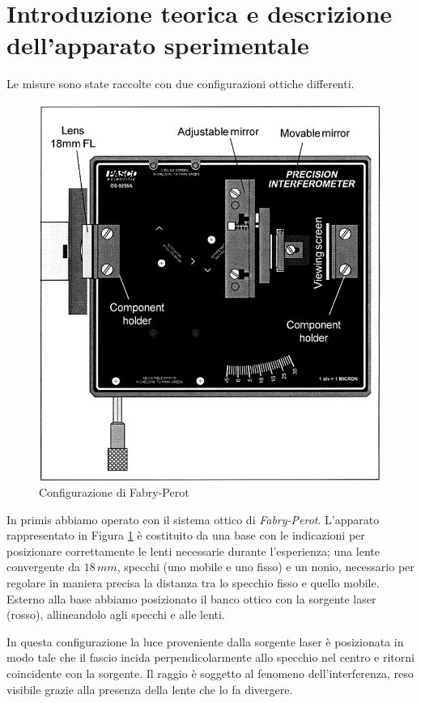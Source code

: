 \section{Introduzione teorica e descrizione dell'apparato sperimentale}
Le misure sono state raccolte con due configurazioni ottiche differenti. 
\begin{figure}[h!]
    \centering
    \includegraphics[scale=.45]{immagini/faby pero.png}
    \caption{Configurazione di Fabry-Perot}
    \label{fabi pero}
\end{figure}
In primis abbiamo operato con il sistema ottico di \textit{Fabry-Perot}. L'apparato rappresentato in Figura \ref{fabi pero} è costituito da una base con le indicazioni per posizionare correttamente le lenti necessarie durante l'esperienza; una lente convergente da $18\,mm$, specchi (uno mobile e uno fisso) e un nonio, necessario per regolare in maniera precisa la distanza tra lo specchio fisso e quello mobile. Esterno alla base abbiamo posizionato il banco ottico con la sorgente laser (rosso), allineandolo agli specchi e alle lenti.

In questa configurazione la luce proveniente dalla sorgente laser è posizionata in modo tale che il fascio incida perpendicolarmente allo specchio nel centro e ritorni coincidente con la sorgente. Il raggio è soggetto al fenomeno dell'interferenza, reso visibile grazie alla presenza della lente che lo fa divergere.

